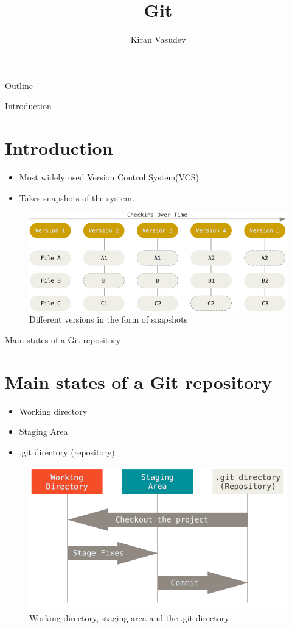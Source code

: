 \documentclass{beamer}
\title{Git}
\author{Kiran Vasudev\inst{1}}
\institute[Universities of Somewhere and Elsewhere] 
{
  \inst{1}
  Hochschule Bonn-Rhein-Sieg

}
\begin{document}
\begin{frame}
  \titlepage
\end{frame}

\begin{frame}{Outline}
  \tableofcontents
\end{frame}

\begin{frame}{Introduction}
\section{Introduction}
  \begin{itemize}
  \item {
    Most widely used Version Control System(VCS)
  }
  \item {
    Takes snapshots of the system.
  }
  \end{itemize}
\begin{figure}
	\includegraphics[scale=0.3]{images/git}
	\caption{Different versions in the form of snapshots\cite{git-basics}}
\end{figure}
\end{frame}

\begin{frame}{Main states of a Git repository}
\section{Main states of a Git repository}
  \begin{itemize}
  \item {
    Working directory
  }
  \item {   
    Staging Area
  }
  \item {   
    .git directory (repository)
  }
  \end{itemize}
	\begin{figure}
		\includegraphics[scale=0.3]{images/areas}
		\caption{Working directory, staging area and the .git directory\cite{git-basics}}
	\end{figure}
\end{frame}
\end{document}
